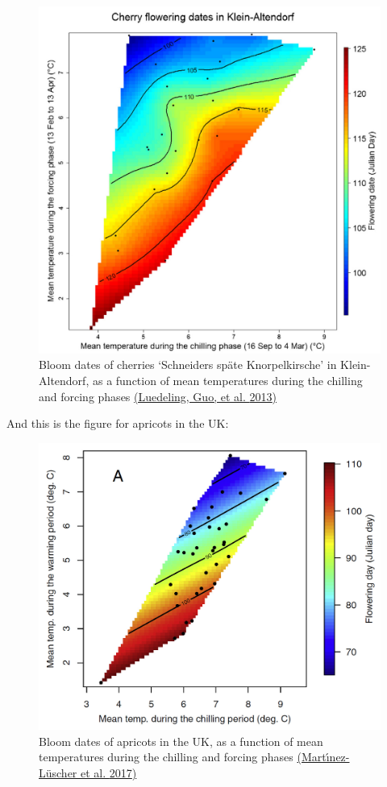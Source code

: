 \documentclass[
]{book}
\begin{document}
\begin{figure}
\centering
\includegraphics{pictures/Rainbow_cherries_Klein-Altendorf.jpg}
\caption{Bloom dates of cherries `Schneiders späte Knorpelkirsche' in Klein-Altendorf, as a function of mean temperatures during the chilling and forcing phases \href{https://doi.org/10.1016/j.agrformet.2013.06.018}{(Luedeling, Guo, et al. \protect\hyperlink{ref-luedeling2013differential}{2013})}}
\end{figure}

And this is the figure for apricots in the UK:

\begin{figure}
\centering
\includegraphics{pictures/Rainbow_apricots_UK.jpg}
\caption{Bloom dates of apricots in the UK, as a function of mean temperatures during the chilling and forcing phases \href{https://doi.org/10.1016/j.agrformet.2017.02.017}{(Martı́nez-Lüscher et al. \protect\hyperlink{ref-martinez2017delayed}{2017})}}
\end{figure}
\end{document}
